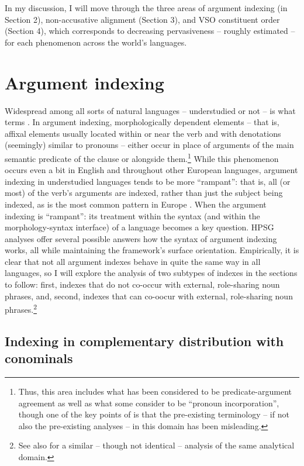\documentclass[output=paper
	        ,collection
	        ,collectionchapter
 	        ,biblatex
                ,babelshorthands
                ,newtxmath
                ,draftmode
                ,colorlinks, citecolor=brown
]{langscibook}
\begin{document}
In my discussion, I will move through the three areas of argument indexing (in Section 2), non-accusative alignment (Section 3), and VSO constituent order (Section 4), which corresponds to decreasing pervasiveness -- roughly estimated -- for each phenomenon across the world's languages.       

\section{Argument indexing}

Widespread among all sorts of natural languages -- understudied or not -- is what \citet{haspelmath13} terms . In argument indexing, morphologically dependent elements -- that is, affixal elements usually located within or near the verb and with denotations (seemingly) similar to pronouns -- either occur in place of arguments of the main semantic predicate of the clause or alongside them.\footnote{Thus, this area includes what has been considered to be predicate-argument agreement as well as what some consider to be ``pronoun incorporation'', though one of the key points of \citet{haspelmath13} is that the pre-existing terminology -- if not also the pre-existing analyses -- in this domain has been misleading.} While this phenomenon occurs even a bit in English and throughout other European languages, argument indexing in understudied languages tends to be more ``rampant'': that is, all (or most) of the verb's arguments are indexed, rather than just the subject being indexed, as is the most common pattern in Europe \citep{siewierskaWALSvpm}. When the argument indexing is ``rampant'': its treatment within the syntax (and within the morphology-syntax interface) of a language becomes a key question. HPSG analyses offer several possible answers how the syntax of argument indexing works, all while maintaining the framework's surface orientation. Empirically, it is clear that not all argument indexes behave in quite the same way in all languages, so I will explore the analysis of two subtypes of indexes in the sections to follow: first, indexes that do not co-occur with external, role-sharing noun phrases, and, second, indexes that can co-oocur with external, role-sharing noun phrases.\footnote{See also \citet{saleem10} for a similar -- though not identical -- analysis of the same analytical domain.}   

\subsection{Indexing in complementary distribution with conominals} \label{pro-indexes}
\end{document}

